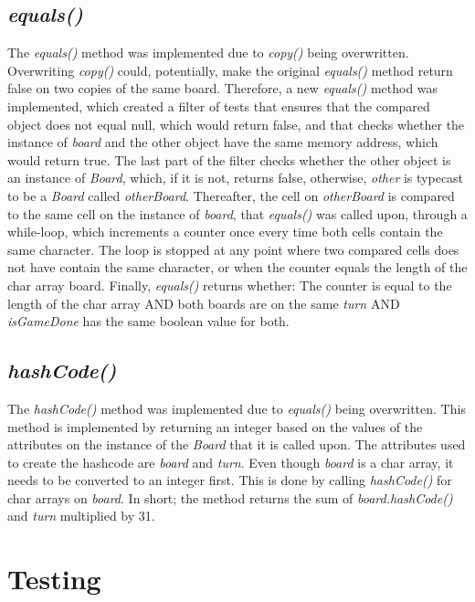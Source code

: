 \documentclass[12pt, a4paper]{article}
\begin{document}
\subsection{\emph{equals()}}
The \emph{equals()} method was implemented due to \emph{copy()} being overwritten. Overwriting \emph{copy()} could, potentially, make the original \emph{equals()} method return false on two copies of the same board. Therefore, a new \emph{equals()} method was implemented, which created a filter of tests that ensures that the compared object does not equal null, which would return false, and that checks whether the instance of \emph{board} and the other object have the same memory address, which would return true. The last part of the filter checks whether the other object is an instance of \emph{Board}, which, if it is not, returns false, otherwise, \emph{other} is typecast to be a \emph{Board} called \emph{otherBoard}. Thereafter, the cell on \emph{otherBoard} is compared to the same cell on the instance of \emph{board}, that \emph{equals()} was called upon, through a while-loop, which increments a counter once every time both cells contain the same character. The loop is stopped at any point where two compared cells does not have contain the same character, or when the counter equals the length of the char array board. Finally, \emph{equals()} returns whether: The counter is equal to the length of the char array AND both boards are on the same \emph{turn} AND \emph{isGameDone} has the same boolean value for both.

\newpage

\subsection{\emph{hashCode()}}
The \emph{hashCode()} method was implemented due to \emph{equals()} being overwritten. This method is implemented by returning an integer based on the values of the attributes on the instance of the \emph{Board} that it is called upon. The attributes used to create the hashcode are \emph{board} and \emph{turn}. Even though \emph{board} is a char array, it needs to be converted to an integer first. This is done by calling \emph{hashCode()} for char arrays on \emph{board}. In short; the method returns the sum of \emph{board.hashCode()} and \emph{turn} multiplied by 31.

\newpage

\section{Testing}
\end{document}
